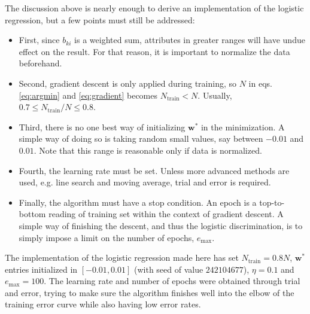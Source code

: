 The discussion above is nearly enough to derive an implementation of the logistic regression,
but a few points must still be addressed:
%
\begin{itemize}
    \item 
    First, since $b_{ki}$ is a weighted sum, attributes in greater ranges
    will have undue effect on the result. For that reason, it is important to normalize the data beforehand.

    \item 
    Second, gradient descent is only applied during training, 
    so $N$ in eqs. \eqref{eq:argmin} and \eqref{eq:gradient}
    becomes $N_\text{train} < N$.
    Usually, $0.7 \leq N_\text{train} / N \leq 0.8$.

    \item
    Third, there is no one best way of initializing $\mathbf{w}^*$ in the minimization.
    A simple way of doing so is taking random small values, say between $-0.01$ and $0.01$.
    Note that this range is reasonable only if data is normalized.

    \item 
    Fourth, the learning rate must be set. 
    Unless more advanced methods are used, e.g. line search and moving average,
    trial and error is required.

    \item
    Finally, the algorithm must have a stop condition.
    An epoch is a top-to-bottom reading of training set within the context of gradient descent.
    A simple way of finishing the descent, and thus the logistic discrimination,
    is to simply impose a limit on the number of epochs, $e_{\max}$.
\end{itemize}

The implementation of the logistic regression made here has set
$N_\text{train} = 0.8 N$, 
$\mathbf{w}^*$ entries initialized in $[-0.01, 0.01]$ (with seed of value $242104677$), 
$\eta = 0.1$ and $e_{\max} = 100$.
%
The learning rate and number of epochs were obtained through trial and error,
trying to make sure the algorithm finishes well into the elbow of the training error curve
while also having low error rates. 

